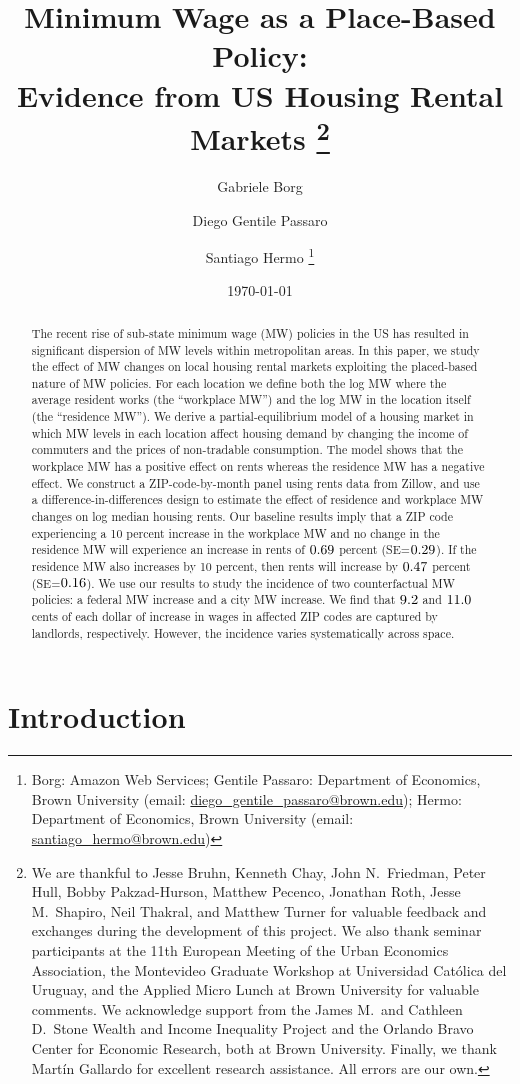 \documentclass{article}
\title{ Minimum Wage as a Place-Based Policy: \\
        Evidence from US Housing Rental Markets%
        \thanks{We are thankful to Jesse Bruhn, Kenneth Chay, John N.\ Friedman, 
        Peter Hull, Bobby Pakzad-Hurson, Matthew Pecenco, Jonathan Roth, 
        Jesse M.\ Shapiro, Neil Thakral, and Matthew Turner
        for valuable feedback and exchanges during the development of 
        this project.
        We also thank seminar participants at 
        the 11th European Meeting of the Urban Economics Association, 
        the Montevideo Graduate Workshop at Universidad Católica del Uruguay, and
        the Applied Micro Lunch at Brown University for valuable comments.
        We acknowledge support from 
        the James M.\ and Cathleen D.\ Stone Wealth and Income Inequality Project and 
        the Orlando Bravo Center for Economic Research, both at Brown University.
        Finally, we thank Martín Gallardo for excellent research assistance.
        All errors are our own.}}
\author{Gabriele Borg \and Diego Gentile Passaro \and Santiago Hermo%
        \footnote{Borg: Amazon Web Services;
        Gentile Passaro: Department of Economics, Brown University 
        (email: \url{diego_gentile_passaro@brown.edu}); 
        Hermo: Department of Economics, Brown University 
        (email: \url{santiago_hermo@brown.edu})}}
\date{\today}
\begin{document}
\maketitle

\begin{abstract}
    \noindent
    The recent rise of sub-state minimum wage (MW) policies in the US has 
    resulted in significant dispersion of MW levels within metropolitan areas.
    In this paper, we study the effect of MW changes on local housing rental 
    markets exploiting the placed-based nature of MW policies.
    For each location we define both
    the log MW where the average resident works (the ``workplace MW'')
    and the log MW in the location itself (the ``residence MW'').
    We derive a partial-equilibrium model of a housing market
    in which MW levels in each location affect housing demand by 
    changing the income of commuters and the prices of non-tradable consumption.
    The model shows that the workplace MW has a positive effect on rents 
    whereas the residence MW has a negative effect.
    We construct a ZIP-code-by-month panel using rents data from Zillow, and
    use a difference-in-differences design to estimate the effect of 
    residence and workplace MW changes on log median housing rents.
    Our baseline results imply that a ZIP code experiencing a 
    10 percent increase in the workplace MW and 
    no change in the residence MW will experience an increase in rents 
    of $0.69$ percent (SE=$0.29$).
    If the residence MW also increases by 10 percent, then 
    rents will increase by $0.47$ percent (SE=$0.16$).
    We use our results to study the incidence of two counterfactual MW policies:
    a federal MW increase and a city MW increase.
    We find that $\textnormal{9.2}$ and $\textnormal{11.0}$ 
    cents of each dollar of increase in wages in affected ZIP codes are captured 
    by landlords, respectively.
    However, the incidence varies systematically across space.
\end{abstract}

\vspace{5mm}


\clearpage

\section{Introduction}\label{sec:intro}
    
\end{document}

